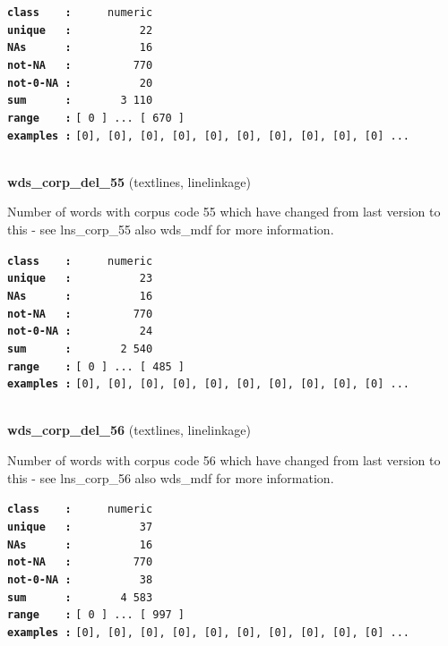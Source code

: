 \documentclass[]{article}
\begin{document}
\textbf{\texttt{class\ \ \ \ :}} \texttt{~~~~~numeric}\\
\textbf{\texttt{unique\ \ \ :}} \texttt{~~~~~~~~~~22}\\
\textbf{\texttt{NAs\ \ \ \ \ \ :}} \texttt{~~~~~~~~~~16}\\
\textbf{\texttt{not-NA\ \ \ :}} \texttt{~~~~~~~~~770}\\
\textbf{\texttt{not-0-NA\ :}} \texttt{~~~~~~~~~~20}\\
\textbf{\texttt{sum\ \ \ \ \ \ :}} \texttt{~~~~~~~3~110}\\
\textbf{\texttt{range\ \ \ \ :}}
\texttt{{[}\ 0\ {]}\ ...\ {[}\ 670\ {]}}\\
\textbf{\texttt{examples\ :}}
\texttt{{[}0{]},\ {[}0{]},\ {[}0{]},\ {[}0{]},\ {[}0{]},\ {[}0{]},\ {[}0{]},\ {[}0{]},\ {[}0{]},\ {[}0{]}\ ...}\\

~

\textbf{wds\_corp\_del\_55} (textlines, linelinkage)

Number of words with corpus code 55 which have changed from last version
to this - see lns\_corp\_55 also wds\_mdf for more information.

\textbf{\texttt{class\ \ \ \ :}} \texttt{~~~~~numeric}\\
\textbf{\texttt{unique\ \ \ :}} \texttt{~~~~~~~~~~23}\\
\textbf{\texttt{NAs\ \ \ \ \ \ :}} \texttt{~~~~~~~~~~16}\\
\textbf{\texttt{not-NA\ \ \ :}} \texttt{~~~~~~~~~770}\\
\textbf{\texttt{not-0-NA\ :}} \texttt{~~~~~~~~~~24}\\
\textbf{\texttt{sum\ \ \ \ \ \ :}} \texttt{~~~~~~~2~540}\\
\textbf{\texttt{range\ \ \ \ :}}
\texttt{{[}\ 0\ {]}\ ...\ {[}\ 485\ {]}}\\
\textbf{\texttt{examples\ :}}
\texttt{{[}0{]},\ {[}0{]},\ {[}0{]},\ {[}0{]},\ {[}0{]},\ {[}0{]},\ {[}0{]},\ {[}0{]},\ {[}0{]},\ {[}0{]}\ ...}\\

~

\textbf{wds\_corp\_del\_56} (textlines, linelinkage)

Number of words with corpus code 56 which have changed from last version
to this - see lns\_corp\_56 also wds\_mdf for more information.

\textbf{\texttt{class\ \ \ \ :}} \texttt{~~~~~numeric}\\
\textbf{\texttt{unique\ \ \ :}} \texttt{~~~~~~~~~~37}\\
\textbf{\texttt{NAs\ \ \ \ \ \ :}} \texttt{~~~~~~~~~~16}\\
\textbf{\texttt{not-NA\ \ \ :}} \texttt{~~~~~~~~~770}\\
\textbf{\texttt{not-0-NA\ :}} \texttt{~~~~~~~~~~38}\\
\textbf{\texttt{sum\ \ \ \ \ \ :}} \texttt{~~~~~~~4~583}\\
\textbf{\texttt{range\ \ \ \ :}}
\texttt{{[}\ 0\ {]}\ ...\ {[}\ 997\ {]}}\\
\textbf{\texttt{examples\ :}}
\texttt{{[}0{]},\ {[}0{]},\ {[}0{]},\ {[}0{]},\ {[}0{]},\ {[}0{]},\ {[}0{]},\ {[}0{]},\ {[}0{]},\ {[}0{]}\ ...}\\
\end{document}
